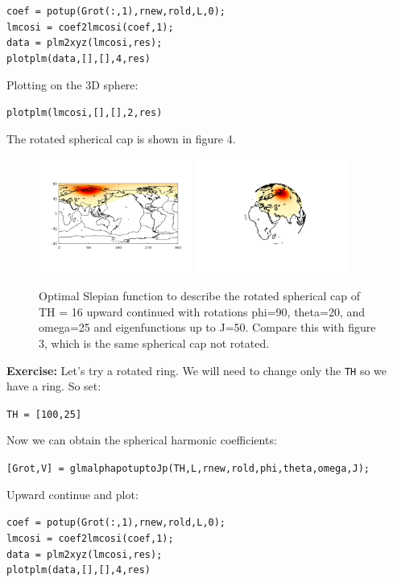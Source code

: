 \documentclass[11pt]{article}
\begin{document}
\verb|coef = potup(Grot(:,1),rnew,rold,L,0);|\\
\verb|lmcosi = coef2lmcosi(coef,1);|\\
\verb|data = plm2xyz(lmcosi,res);|\\
\verb|plotplm(data,[],[],4,res)|

Plotting on the 3D sphere:

\verb|plotplm(lmcosi,[],[],2,res)|

The rotated spherical cap is shown in figure 4.

\begin{figure}[H]
  \centering
  \includegraphics[width=0.45\textwidth]{figures/rot16flat.png}
  \includegraphics[width=0.45\textwidth]{figures/rot16.png}
  \caption{Optimal Slepian function to describe the rotated spherical cap of TH = 16 upward continued with rotations phi=90, theta=20, and omega=25 and eigenfunctions up to J=50.  Compare this with figure 3, which is the same spherical cap not rotated.}
\label{Grot}
\end{figure}

\textbf{Exercise:} Let's try a rotated ring.  We will need to change only the \verb|TH| so we have a ring.  So set:

\verb|TH = [100,25]|

Now we can obtain the spherical harmonic coefficients:

\verb|[Grot,V] = glmalphapotuptoJp(TH,L,rnew,rold,phi,theta,omega,J);|

Upward continue and plot:

\verb|coef = potup(Grot(:,1),rnew,rold,L,0);|\\
\verb|lmcosi = coef2lmcosi(coef,1);|\\
\verb|data = plm2xyz(lmcosi,res);|\\
\verb|plotplm(data,[],[],4,res)|
\end{document}
